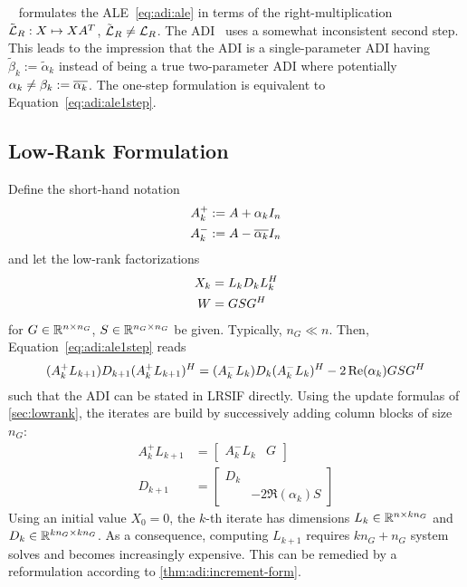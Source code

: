 \begin{remark}
  \citeauthor{Lang2017}~\cite{Lang2017} formulates the \ac{ALE}~\eqref{eq:adi:ale} in terms of the
  right-multiplication $\tilde {\operatorname{\mathcal L}}_R :X \mapsto XA^T$, $\tilde {\operatorname{\mathcal L}}_R \neq \operatorname{\mathcal L}_R$.
  The \ac{ADI}~\cite[Equation~(2.23)]{Lang2017} uses a somewhat inconsistent second step.
  This leads to the impression that the \ac{ADI} is a single-parameter \ac{ADI} having $\tilde\beta_k := \tilde\alpha_k$
  instead of being a true two-parameter \ac{ADI} where potentially $\alpha_k \neq \beta_k := \conj{\alpha_k}$.
  The one-step formulation \cite[Equation~(2.24)]{Lang2017} is equivalent to Equation~\eqref{eq:adi:ale1step}.
\end{remark}

\subsection{Low-Rank Formulation}
\label{sec:adi:lr1step}

Define the short-hand notation
\begin{equation}
\label{eq:adi:ale:shorthand}
\begin{aligned}
  A^+_k &:= A + \alpha_k I_n \\
  A^-_k &:= A - \conj{\alpha_k} I_n
\end{aligned}
\end{equation}
and let the low-rank factorizations
\begin{equation}
\begin{aligned}
  X_k &= L_k D_k L_k^H \\
  W &= GSG^H
\end{aligned}
\end{equation}
for $G\in\mathbb{R}^{n\times n_G}$, $S\in\mathbb{R}^{n_G\times n_G}$ be given.
Typically, $n_G \ll n$.
Then, Equation~\eqref{eq:adi:ale1step} reads
\begin{equation}
  (A_k^+ L_{k+1}) D_{k+1} (A_k^+ L_{k+1})^H
  = (A_k^- L_k) D_k (A_k^- L_k)^H - 2\operatorname{Re}(\alpha_k) GSG^H
\end{equation}
such that
the \ac{ADI} can be stated in \ac{LRSIF} directly.
Using the update formulas of \autoref{sec:lowrank},
the iterates are build by successively adding column blocks of size $n_G$:
\begin{equation}
\begin{aligned}
  A_k^+ L_{k+1} &= \begin{bmatrix}
    A^-_k L_k &
    G
  \end{bmatrix} \\
  D_{k+1} &= \begin{bmatrix}
    D_k \\
    & -2\Re(\alpha_k) S
  \end{bmatrix}
\end{aligned}
\end{equation}
Using an initial value $X_0=0$,
the $k$-th iterate has dimensions $L_k \in\mathbb{R}^{n\times kn_G}$ and $D_k \in\mathbb{R}^{kn_G\times kn_G}$.
As a consequence, computing $L_{k+1}$
requires $kn_G + n_G$ system solves and
becomes increasingly expensive.
This can be remedied by a reformulation according to \autoref{thm:adi:increment-form}.

